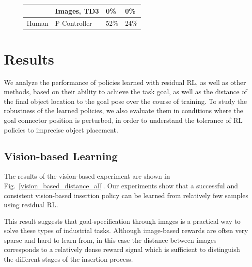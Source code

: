 \begin{figure}
{\begin{minipage}[t]{.5\textwidth}
\begin{tabular}{|l|l|l|l|}
           & Images, TD3 & 0\% & 0\% \\ \hline
        \multirow{1}{*}{Human} & P-Controller & 52\% & 24\% \\   \hline
        \end{tabular}
\end{minipage}}
    \label{fig:tables}
    
\end{figure}


        
       

\section{Results}\label{sec:results}

We analyze the performance of policies learned with residual RL, as well as other methods, based on their ability to achieve the task goal, as well as the distance of the final object location to the goal pose over the course of training. To study the robustness of the learned policies, we also evaluate them in conditions where the goal connector position is perturbed, in order to understand the tolerance of RL policies to imprecise object placement.

\subsection{Vision-based Learning}
The results of the vision-based experiment are shown in Fig.~\ref{vision_based_distance_all}.
Our experiments show that a successful and consistent vision-based insertion policy can be learned from relatively few samples using residual RL. 

This result suggests that goal-specification through images is a practical way to solve these types of industrial tasks. Although image-based rewards are often very sparse and hard to learn from, in this case the distance between images corresponds to a relatively dense reward signal which is sufficient to distinguish the different stages of the insertion process.

